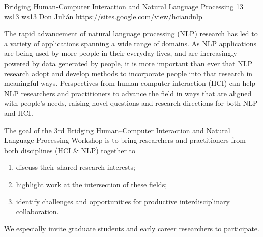 \begin{wsschedulenolist}
{Bridging Human-Computer Interaction and Natural Language Processing}
{13}
{ws13}
{ws13}
{Don Juli\'an}
{https://sites.google.com/view/hciandnlp}

The rapid advancement of natural language processing (NLP) research has led to a variety of applications spanning a wide range of domains. As NLP applications are being used by more people in their everyday lives, and are increasingly powered by data generated by people, it is more important than ever that NLP research adopt and develop methods to incorporate people into that research in meaningful ways. Perspectives from human-computer interaction (HCI) can help NLP researchers and practitioners to advance the field in ways that are aligned with people's needs, raising novel questions and research directions for both NLP and HCI.

The goal of the 3rd Bridging Human--Computer Interaction and Natural Language Processing Workshop is to bring researchers and practitioners from both disciplines (HCI \& NLP) together to

\begin{enumerate}
    \item discuss their shared research interests;
    \item highlight work at the intersection of these fields;
    \item identify challenges and opportunities for productive interdisciplinary collaboration.
\end{enumerate}

We especially invite graduate students and early career researchers to participate.

\end{wsschedulenolist}
